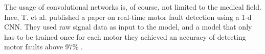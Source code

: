 The usage of convolutional networks is, of course, not limited to the medical field. Ince, T. et al. published a paper on real-time motor fault detection using a 1-d CNN. They used raw signal data as input to the model, and a model that only has to be trained once for each motor they achieved an accuracy of detecting motor faults above 97\% \cite{motor_fault_conv}.